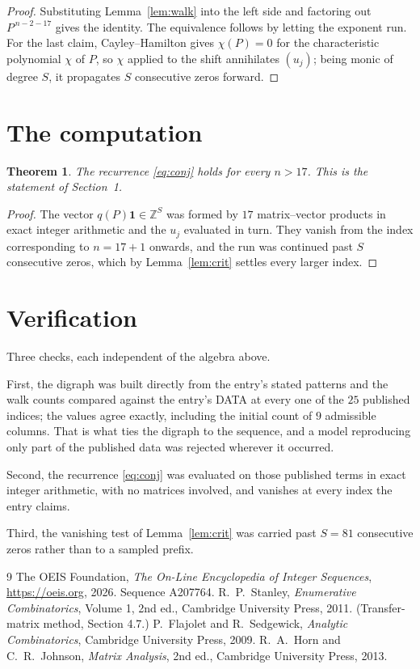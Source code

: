 \documentclass[11pt,a4paper]{article}
\theoremstyle{plain}
\newtheorem{theorem}{Theorem}
\theoremstyle{definition}
\begin{document}
\begin{proof}
Substituting Lemma~\ref{lem:walk} into the left side and factoring out
$P^{\,n-2-17}$ gives the identity. The equivalence follows by letting the exponent
run. For the last claim, Cayley--Hamilton gives $\chi(P)=0$ for the characteristic
polynomial $\chi$ of $P$, so $\chi$ applied to the shift annihilates $(u_j)$; being monic of
degree $S$, it propagates $S$ consecutive zeros forward.
\end{proof}

\section{The computation}

\begin{theorem}
The recurrence \eqref{eq:conj} holds for every $n>17$. This is the statement of
Section~1.
\end{theorem}

\begin{proof}
The vector $q(P)\mathbf{1}\in\mathbb{Z}^{S}$ was formed by $17$ matrix--vector
products in exact integer arithmetic and the $u_j$ evaluated in turn. They vanish from the
index corresponding to $n=17+1$ onwards, and the run was continued past $S$ consecutive
zeros, which by Lemma~\ref{lem:crit} settles every larger index.
\end{proof}

\section{Verification}

Three checks, each independent of the algebra above.

First, the digraph was built directly from the entry's stated patterns and the walk counts
compared against the entry's DATA at every one of the $25$ published indices; the
values agree exactly, including the initial count of $9$ admissible columns. That is
what ties the digraph to the sequence, and a model reproducing only part of the published
data was rejected wherever it occurred.

Second, the recurrence \eqref{eq:conj} was evaluated on those published terms in exact
integer arithmetic, with no matrices involved, and vanishes at every index the entry claims.

Third, the vanishing test of Lemma~\ref{lem:crit} was carried past $S=81$ consecutive
zeros rather than to a sampled prefix.

\begin{thebibliography}{9}
 The OEIS Foundation, \emph{The On-Line Encyclopedia of Integer
Sequences}, \url{https://oeis.org}, 2026. Sequence A207764.
 R.~P.~Stanley, \emph{Enumerative Combinatorics}, Volume 1, 2nd ed.,
Cambridge University Press, 2011. (Transfer-matrix method, Section 4.7.)
 P.~Flajolet and R.~Sedgewick, \emph{Analytic Combinatorics}, Cambridge
University Press, 2009.
 R.~A.~Horn and C.~R.~Johnson, \emph{Matrix Analysis}, 2nd ed., Cambridge
University Press, 2013.
\end{thebibliography}
\end{document}
